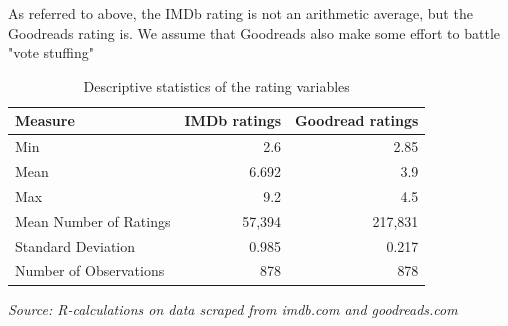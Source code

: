 \documentclass[12pt]{article}
\begin{document}
As referred to above, the IMDb rating is not an arithmetic average, but the Goodreads rating is. We assume that Goodreads also make some effort to battle "vote stuffing"
\begin{table}[thb!]
\caption{Descriptive statistics of the rating variables}\label{tab:descr}
\begin{threeparttable}
\begin{tabular*}{\textwidth}{@{\extracolsep{\fill} }lrr}
\textbf{Measure} & \textbf{IMDb ratings} & \textbf{Goodread ratings} \\
\hline
Min & 2.6 & 2.85 \\  
Mean & 6.692 & 3.9  \\
Max & 9.2 & 4.5 \\
Mean Number of Ratings & 57,394 & 217,831 \\
Standard Deviation & 0.985 & 0.217 \\
Number of Observations & 878 & 878 \\
\hline
\end{tabular*}
\begin{tablenotes}
\footnotesize
\item \emph{Source: R-calculations on data scraped from imdb.com and goodreads.com}
\end{tablenotes}
\end{threeparttable}
\end{table}
\end{document}
